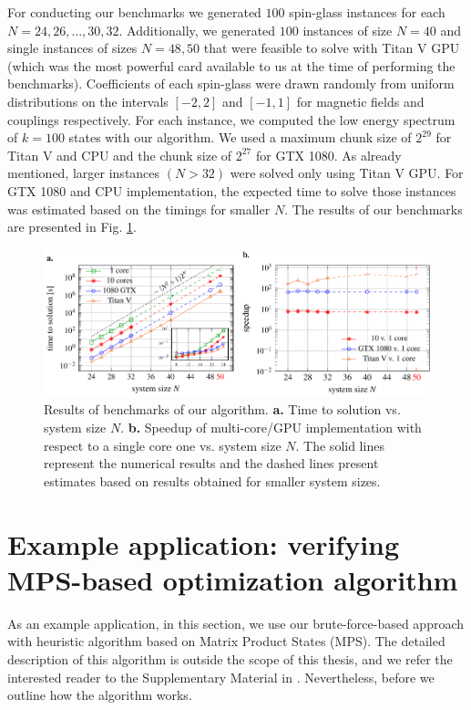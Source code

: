 For conducting our benchmarks we generated $100$ spin-glass instances for each
$N=24, 26, \ldots, 30, 32$. Additionally, we generated $100$ instances of size
$N=40$ and single instances of sizes $N=48, 50$ that were feasible to solve
with Titan V GPU (which was the most powerful card available to us at the time
of performing the benchmarks). Coefficients of each spin-glass were drawn
randomly from uniform distributions on the intervals $[-2, 2]$ and $[-1, 1]$
for magnetic fields and couplings respectively. For each instance, we computed
the low energy spectrum of $k=100$ states with our algorithm. We used a maximum
chunk size of $2^{29}$ for Titan V and CPU and the chunk size of $2^{27}$ for
GTX 1080. As already mentioned, larger instances $(N > 32)$ were solved only
using Titan V GPU. For GTX 1080 and CPU implementation, the expected time to
solve those instances was estimated based on the timings for smaller $N$. The
results of our benchmarks are presented in Fig. \ref{fig:benchmark_results}.

\begin{figure}
  \centering
  \includegraphics[width=\textwidth]{figures/resultsplot_reduced.pdf}
  \caption{Results of benchmarks of our algorithm. {\textbf{a.}} Time to solution vs.
    system size $N$. {\textbf{b.}} Speedup of multi-core/GPU implementation with
    respect to a single core one vs. system size $N$. The solid lines represent the
    numerical results and the dashed lines present estimates based on results
    obtained for smaller system sizes.} \label{fig:benchmark_results}
\end{figure}

\section[Example application]{Example application: verifying MPS-based optimization algorithm}

As an example application, in this section, we use our brute-force-based
approach with heuristic algorithm based on Matrix Product States (MPS). The
detailed description of this algorithm is outside the scope of this thesis, and
we refer the interested reader to the Supplementary Material in \cite{tn}.
Nevertheless, before we outline how the algorithm works.


